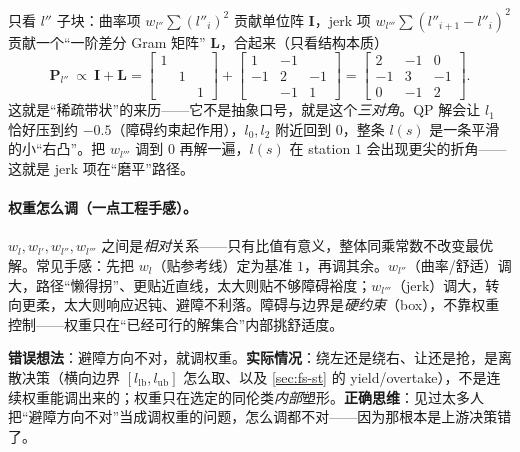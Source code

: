 只看 $l''$ 子块：曲率项 $w_{l''}\sum(l''_i)^2$ 贡献单位阵 $\mathbf{I}$，jerk 项 $w_{l'''}\sum(l''_{i+1}-l''_i)^2$ 贡献一个“一阶差分 Gram 矩阵” $\mathbf{L}$，合起来（只看结构本质）
\begin{equation}
  \mathbf{P}_{l''}\ \propto\ \mathbf{I}+\mathbf{L}
  =\begin{bmatrix}1&&\\&1&\\&&1\end{bmatrix}
  +\begin{bmatrix}1&-1&\\-1&2&-1\\&-1&1\end{bmatrix}
  =\begin{bmatrix}2&-1&0\\-1&3&-1\\0&-1&2\end{bmatrix}.
  \label{eq:fs-tridiag}
\end{equation}
这就是“稀疏带状”的来历——它不是抽象口号，就是这个\emph{三对角}。QP 解会让 $l_1$ 恰好压到约 $-0.5$（障碍约束起作用），$l_0,l_2$ 附近回到 $0$，整条 $l(s)$ 是一条平滑的小“右凸”。把 $w_{l'''}$ 调到 $0$ 再解一遍，$l(s)$ 在 station $1$ 会出现更尖的折角——这就是 jerk 项在“磨平”路径。

\paragraph{权重怎么调（一点工程手感）。}
$w_l,w_{l'},w_{l''},w_{l'''}$ 之间是\emph{相对}关系——只有比值有意义，整体同乘常数不改变最优解。常见手感：先把 $w_l$（贴参考线）定为基准 $1$，再调其余。$w_{l''}$（曲率/舒适）调大，路径“懒得拐”、更贴近直线，太大则贴不够障碍裕度；$w_{l'''}$（jerk）调大，转向更柔，太大则响应迟钝、避障不利落。障碍与边界是\emph{硬约束}（box），不靠权重控制——权重只在“已经可行的解集合”内部挑舒适度。

\begin{pitfall}
\textbf{错误想法}：避障方向不对，就调权重。\textbf{实际情况}：绕左还是绕右、让还是抢，是离散决策（横向边界 $[l_{\mathrm{lb}},l_{\mathrm{ub}}]$ 怎么取、以及 \cref{sec:fs-st} 的 yield/overtake），不是连续权重能调出来的；权重只在选定的同伦类\emph{内部}塑形。\textbf{正确思维}：见过太多人把“避障方向不对”当成调权重的问题，怎么调都不对——因为那根本是上游决策错了。
\end{pitfall}

